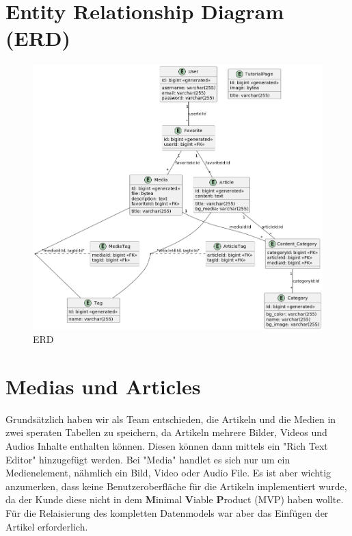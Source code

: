 \section{\textbf{E}ntity \textbf{R}elationship \textbf{D}iagram (ERD)}
\begin{spacing}{1}

    \begin{figure}[H]
        \centering
        \includegraphics[height=1\textwidth]{./pics/erd.png}
        \caption{ERD}

    \end{figure}
\end{spacing}


\section{Medias und Articles}

Grundsätzlich haben wir als Team entschieden,
die Artikeln und die Medien in zwei speraten Tabellen zu speichern,
da Artikeln mehrere Bilder, Videos und Audios Inhalte enthalten können.
Diesen können dann mittels ein "Rich Text Editor" hinzugefügt werden.
Bei "Media" handlet es sich nur um ein Medienelement,
nähmlich ein Bild, Video oder Audio File. Es ist aber wichtig anzumerken,
dass keine Benutzeroberfläche für die Artikeln implementiert wurde, da der Kunde
diese nicht in dem \textbf{M}inimal \textbf{V}iable \textbf{P}roduct (MVP) haben wollte.
Für die Relaisierung des kompletten Datenmodels war aber das Einfügen der Artikel erforderlich.

